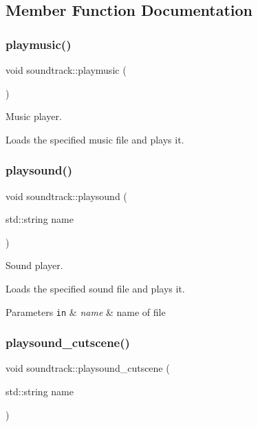\subsection{Member Function Documentation}
\mbox{\label{classsoundtrack_a7569a4c0cde86548197756b8e05cf464}} 
\subsubsection{\texorpdfstring{playmusic()}{playmusic()}}
{\footnotesize\ttfamily void soundtrack\+::playmusic (\begin{DoxyParamCaption}{ }\end{DoxyParamCaption})}



Music player. 

Loads the specified music file and plays it. \mbox{\label{classsoundtrack_aa18de6469aca15922cfa8a8e8412f76d}} 
\subsubsection{\texorpdfstring{playsound()}{playsound()}}
{\footnotesize\ttfamily void soundtrack\+::playsound (\begin{DoxyParamCaption}\item[{std\+::string}]{name }\end{DoxyParamCaption})}



Sound player. 

Loads the specified sound file and plays it. 
\begin{DoxyParams}[1]{Parameters}
\mbox{\tt in}  & {\em name} & name of file \\
\hline
\end{DoxyParams}
\mbox{\label{classsoundtrack_a83744518feb748a979a67a56fae997fe}} 
\subsubsection{\texorpdfstring{playsound\+\_\+cutscene()}{playsound\_cutscene()}}
{\footnotesize\ttfamily void soundtrack\+::playsound\+\_\+cutscene (\begin{DoxyParamCaption}\item[{std\+::string}]{name }\end{DoxyParamCaption})}



